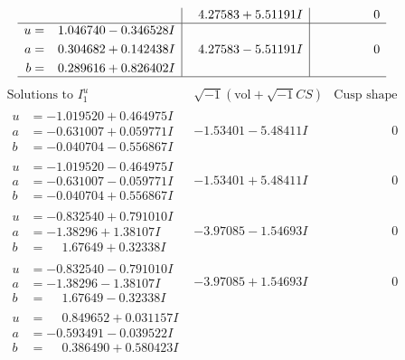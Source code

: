 \documentclass[1p]{elsarticle_modified}
\theoremstyle{definition}
\newcommand{\I}{\sqrt{-1}}
\begin{document}
$$\begin{array}{c|c|c}
 & \phantom{-}4.27583 + 5.51191 I & \phantom{-0.000000 } 0 \\ \hline\begin{aligned}
u &= \phantom{-}1.046740 - 0.346528 I \\
a &= \phantom{-}0.304682 + 0.142438 I \\
b &= \phantom{-}0.289616 + 0.826402 I\end{aligned}
 & \phantom{-}4.27583 - 5.51191 I & \phantom{-0.000000 } 0\\
 \hline 
 \end{array}$$\newpage$$\begin{array}{c|c|c}  
\text{Solutions to }I^u_{1}& \I (\text{vol} + \sqrt{-1}CS) & \text{Cusp shape}\\
 \hline 
\begin{aligned}
u &= -1.019520 + 0.464975 I \\
a &= -0.631007 + 0.059771 I \\
b &= -0.040704 - 0.556867 I\end{aligned}
 & -1.53401 - 5.48411 I & \phantom{-0.000000 } 0 \\ \hline\begin{aligned}
u &= -1.019520 - 0.464975 I \\
a &= -0.631007 - 0.059771 I \\
b &= -0.040704 + 0.556867 I\end{aligned}
 & -1.53401 + 5.48411 I & \phantom{-0.000000 } 0 \\ \hline\begin{aligned}
u &= -0.832540 + 0.791010 I \\
a &= -1.38296 + 1.38107 I \\
b &= \phantom{-}1.67649 + 0.32338 I\end{aligned}
 & -3.97085 - 1.54693 I & \phantom{-0.000000 } 0 \\ \hline\begin{aligned}
u &= -0.832540 - 0.791010 I \\
a &= -1.38296 - 1.38107 I \\
b &= \phantom{-}1.67649 - 0.32338 I\end{aligned}
 & -3.97085 + 1.54693 I & \phantom{-0.000000 } 0 \\ \hline\begin{aligned}
u &= \phantom{-}0.849652 + 0.031157 I \\
a &= -0.593491 - 0.039522 I \\
b &= \phantom{-}0.386490 + 0.580423 I\end{aligned}

\end{array}$$
\end{document}
